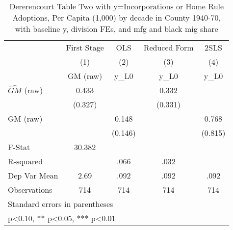 \begin{table}[htbp]\centering
\def\sym#1{\ifmmode^{#1}\else\(^{#1}\)\fi}
\caption{Dererencourt Table Two with y=Incorporations or Home Rule Adoptions, Per Capita (1,000) by decade in County 1940-70, with baseline y, division FEs, and mfg and black mig share}
\begin{tabular}{l*{4}{c}}
\toprule
                    & First Stage   &         OLS   &Reduced Form   &        2SLS   \\
                    &\multicolumn{1}{c}{(1)}&\multicolumn{1}{c}{(2)}&\multicolumn{1}{c}{(3)}&\multicolumn{1}{c}{(4)}\\
                    &\multicolumn{1}{c}{GM  (raw)}&\multicolumn{1}{c}{y\_L0}&\multicolumn{1}{c}{y\_L0}&\multicolumn{1}{c}{y\_L0}\\
\midrule
$\hat{GM}$ (raw)    &       0.433   &               &       0.332   &               \\
                    &     (0.327)   &               &     (0.331)   &               \\
\addlinespace
GM  (raw)           &               &       0.148   &               &       0.768   \\
                    &               &     (0.146)   &               &     (0.815)   \\
\midrule
F-Stat              &      30.382   &               &               &               \\
R-squared           &               &        .066   &        .032   &               \\
Dep Var Mean        &        2.69   &        .092   &        .092   &        .092   \\
Observations        &         714   &         714   &         714   &         714   \\
\bottomrule
\multicolumn{5}{l}{\footnotesize Standard errors in parentheses}\\
\multicolumn{5}{l}{\footnotesize * p<0.10, ** p<0.05, *** p<0.01}\\
\end{tabular}
\end{table}
